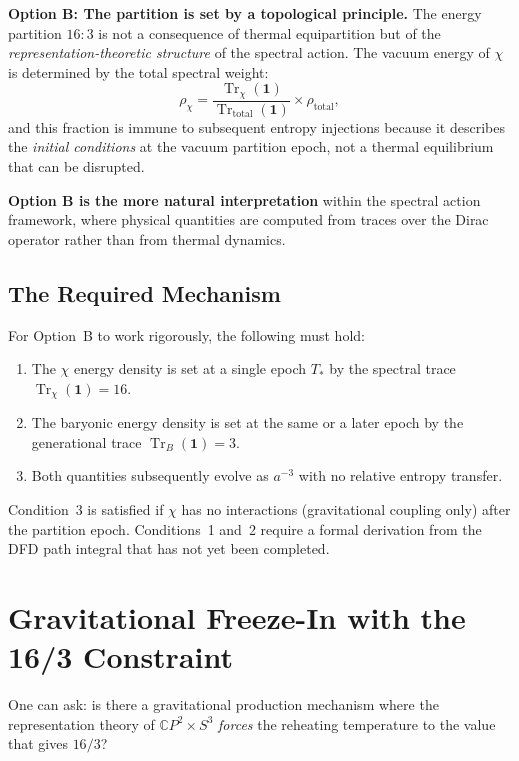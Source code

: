 \documentclass[11pt]{article}
\theoremstyle{definition}
\theoremstyle{remark}
\newcommand{\CP}{\mathbb{C}P}
\newcommand{\Tr}{\operatorname{Tr}}
\begin{document}
\textbf{Option B: The partition is set by a topological principle.}
The energy partition $16:3$ is not a consequence of thermal equipartition
but of the \emph{representation-theoretic structure} of the spectral action.
The vacuum energy of $\chi$ is determined by the total spectral weight:
\begin{equation}
  \rho_\chi = \frac{\Tr_\chi(\mathbf{1})}{\Tr_\mathrm{total}(\mathbf{1})}
  \times \rho_\mathrm{total},
\end{equation}
and this fraction is immune to subsequent entropy injections because it
describes the \emph{initial conditions} at the vacuum partition epoch,
not a thermal equilibrium that can be disrupted.

\textbf{Option B is the more natural interpretation} within the spectral
action framework, where physical quantities are computed from traces over
the Dirac operator rather than from thermal dynamics.

\subsection{The Required Mechanism}

For Option~B to work rigorously, the following must hold:
\begin{enumerate}
  \item The $\chi$ energy density is set at a single epoch $T_*$ by the
    spectral trace $\Tr_\chi(\mathbf{1}) = 16$.
  \item The baryonic energy density is set at the same or a later epoch by
    the generational trace $\Tr_B(\mathbf{1}) = 3$.
  \item Both quantities subsequently evolve as $a^{-3}$ with no relative
    entropy transfer.
\end{enumerate}

Condition~3 is satisfied if $\chi$ has no interactions (gravitational coupling
only) after the partition epoch. Conditions~1 and~2 require a formal derivation
from the DFD path integral that has not yet been completed.


\section{Gravitational Freeze-In with the 16/3 Constraint}
\label{sec:combined}

One can ask: is there a gravitational production mechanism where the
representation theory of $\CP^2 \times S^3$ \emph{forces} the reheating
temperature to the value that gives $16/3$?
\end{document}

